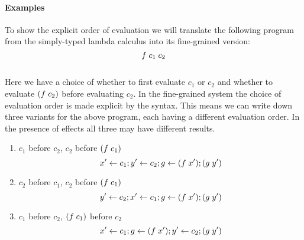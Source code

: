 {\paragraph{Examples}
To show the explicit order of evaluation we will translate the following program from the simply-typed lambda calculus into its fine-grained version:\\
\[f \; c_1 \; c_2\]\\
Here we have a choice of whether to first evaluate $c_1$ or $c_2$ and whether to evaluate $(f \; c_2)$ before evaluating $c_2$.
In the fine-grained system the choice of evaluation order is made explicit by the syntax.
This means we can write down three variants for the above program, each having a different evaluation order.
In the presence of effects all three may have different results.

\begin{enumerate}
\itemsep0em 
\item $c_1$ before $c_2$, $c_2$ before $(f \; c_1)$ 
\[x' \leftarrow c_1 ; y' \leftarrow c_2 ; g \leftarrow (f \; x') ; (g \; y')\]
\item $c_2$ before $c_1$, $c_2$ before $(f \; c_1)$
\[y' \leftarrow c_2 ; x' \leftarrow c_1 ; g \leftarrow (f \; x') ; (g \; y')\]
\item $c_1$ before $c_2$, $(f \; c_1)$ before $c_2$
\[x' \leftarrow c_1 ; g \leftarrow (f \; x') ; y' \leftarrow c_2 ; (g \; y')\]
\end{enumerate}

}
